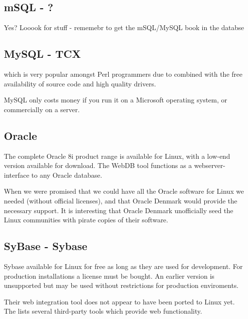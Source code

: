 \subsection{mSQL - ?}
\label{sec:msql}

\textsf{Yes?  Looook for stuff - rememebr to get the mSQL/MySQL book
  in the databse}

\subsection{MySQL - TCX}
\label{sec:mysql}

 which is
very popular amongst Perl programmers due to
combined with the free availability of source code and high quality
drivers.

MySQL only costs money if you run it on a Microsoft operating system,
or commercially on a server.

\subsection{Oracle}
\label{sec:oracle}

The complete Oracle 8i product range is available for Linux, with a
low-end version available for download.  The WebDB tool functions as a
webserver-interface to any Oracle database.

When
 we were promised that we
could have all the Oracle software for Linux we needed (without
official licenses), and that Oracle Denmark would provide the
necessary support.  It is interesting that Oracle Denmark unofficially
seed the Linux communities with pirate copies of their software.

\subsection{SyBase - Sybase}

Sybase  available for
  Linux for free as long as they are used for development.  For
  production installations a license must be bought.  An earlier
  version is unsupported but may be used without restrictions for
  production enviroments.
  
  Their web integration tool does not appear to have been ported to
  Linux yet.  The  lists several third-party tools which provide web
  functionality.

